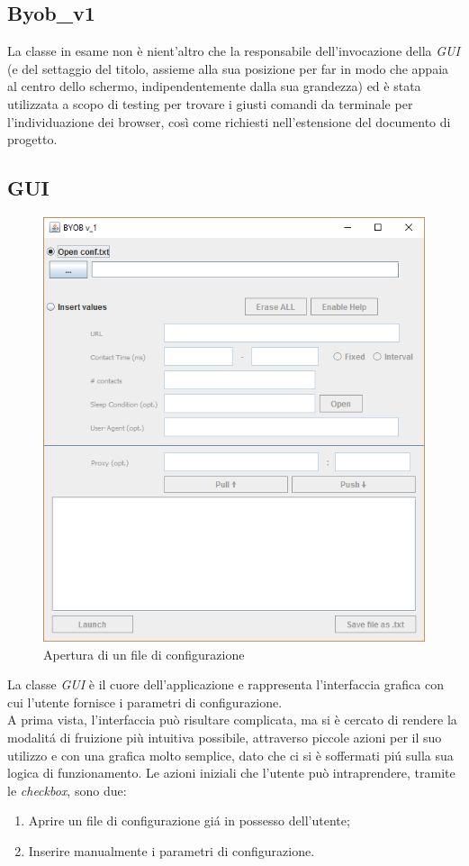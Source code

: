\vspace*{0.5cm}
\subsection{Byob\_v1}
La classe in esame non \`e nient'altro che la responsabile dell'invocazione della \textit{GUI} (e del settaggio del titolo, assieme alla sua posizione per far in modo che appaia al centro dello schermo, indipendentemente dalla sua grandezza) ed \`e stata utilizzata a scopo di testing per trovare i giusti comandi da terminale per l'individuazione dei browser, cos\`i come richiesti nell'estensione del documento di progetto.

\vspace*{0.5cm}
\subsection{GUI}
\begin{figure}[!htb]
        \centering
		\includegraphics[width=0.7\linewidth]{./imgs/gui}
        \caption{Apertura di un file di configurazione}
        \label{apertura}
        \vspace*{0.5cm}
\end{figure}

La classe \textit{GUI} \`e il cuore dell'applicazione e rappresenta l'interfaccia grafica con cui l'utente fornisce i parametri di configurazione.\\
A prima vista, l'interfaccia pu\`o risultare complicata, ma si \`e cercato di rendere la modalit\'a di fruizione pi\`u intuitiva possibile, attraverso piccole azioni per il suo utilizzo e con una grafica molto semplice, dato che ci si \`e soffermati pi\'u sulla sua logica di funzionamento.
Le azioni iniziali che l'utente pu\`o intraprendere, tramite le \textit{checkbox}, sono due:
\begin{enumerate}
\item Aprire un file di configurazione gi\'a in possesso dell'utente;
\item Inserire manualmente i parametri di configurazione.
\end{enumerate}

